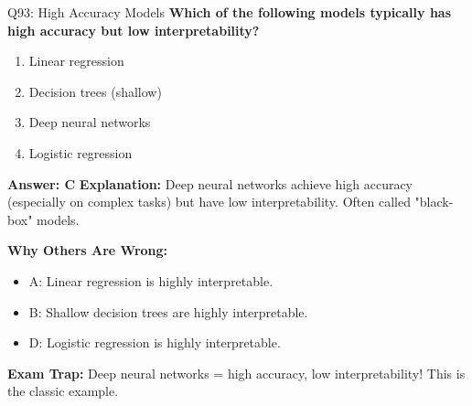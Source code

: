 \documentclass[8pt]{beamer}
\begin{document}
	\begin{frame}{Q93: High Accuracy Models}
		\fontsize{6.5}{7.5}\selectfont
		\textbf{Which of the following models typically has high accuracy but low interpretability?}
		
		\begin{enumerate}
			\item Linear regression
			\item Decision trees (shallow)
			\item Deep neural networks
			\item Logistic regression
		\end{enumerate}
		
		\vspace{0.05cm}
		\textcolor{myblue}{\textbf{Answer: C}}
		\vspace{0.05cm}
		\textcolor{myblue}{\textbf{Explanation:}} Deep neural networks achieve high accuracy (especially on complex tasks) but have low interpretability. Often called "black-box" models.
		
		\vspace{0.05cm}
		\textcolor{myred}{\textbf{Why Others Are Wrong:}}
		\begin{itemize}
			\item \textcolor{myred}{A:} Linear regression is highly interpretable.
			\item \textcolor{myred}{B:} Shallow decision trees are highly interpretable.
			\item \textcolor{myred}{D:} Logistic regression is highly interpretable.
		\end{itemize}
		
		\textcolor{myred}{\textbf{Exam Trap:}} Deep neural networks = \textcolor{myblue}{high accuracy, low interpretability}! This is the classic example.
	\end{frame}
	
\end{document}
